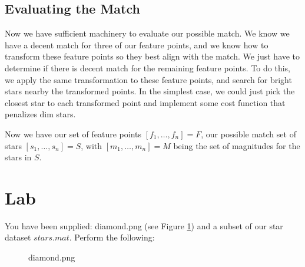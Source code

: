 \documentclass[paper=a4, fontsize=11pt]{scrartcl} %
\begin{document}

\subsection{Evaluating the Match}

Now we have sufficient machinery to evaluate our possible match.  We know we have a decent match for three of our feature points, and we know how to transform these feature points so they best align with the match. We just have to determine if there is decent match for the remaining feature points. To do this, we apply the same transformation to these feature points, and search for bright stars nearby the transformed points. In the simplest case, we could just pick the closest star to each transformed point and implement some cost function that penalizes dim stars.

Now we have our set of feature points $[f_1,\ldots,f_n]=F$, our possible match set of stars $[s_1,\ldots,s_n] = S$, with $[m_1,\ldots,m_n] = M$ being the set of magnitudes for the stars in $S$.




\section{Lab}
You have been supplied: diamond.png (see Figure \ref{diamond}) and a subset of our star dataset $stars.mat$. Perform the following: 

\begin{figure}[!h]
\caption{diamond.png}
\label{diamond}
\end{figure}
\end{document}
